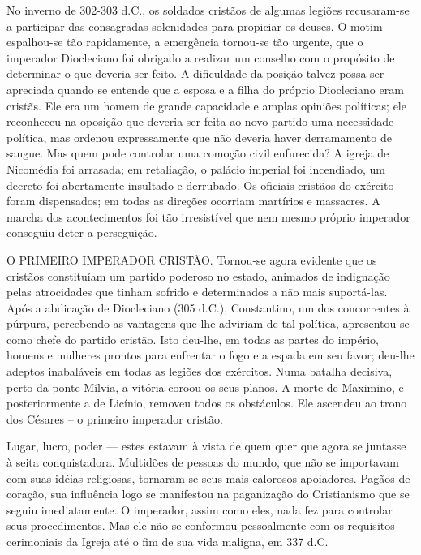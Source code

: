 \documentclass[11pt,a5paper,twoside,openany]{book}
\begin{document}
No inverno de 302-303 d.C., os soldados cristãos de algumas legiões recusaram-se a participar das consagradas solenidades para propiciar os deuses. O motim espalhou-se tão rapidamente, a emergência tornou-se tão urgente, que o imperador Diocleciano foi obrigado a realizar um conselho com o propósito de determinar o que deveria ser feito. A dificuldade da posição talvez possa ser apreciada quando se entende que a esposa e a filha do próprio Diocleciano eram cristãs. Ele era um homem de grande capacidade e amplas opiniões políticas; ele reconheceu na oposição que deveria ser feita ao novo partido uma necessidade política, mas ordenou expressamente que não deveria haver derramamento de sangue. Mas quem pode controlar uma comoção civil enfurecida? A igreja de Nicomédia foi arrasada; em retaliação, o palácio imperial foi incendiado, um decreto foi abertamente insultado e derrubado. Os oficiais cristãos do exército foram dispensados; em todas as direções ocorriam martírios e massacres. A marcha dos acontecimentos foi tão irresistível que nem mesmo próprio imperador conseguiu deter a perseguição.

O PRIMEIRO IMPERADOR CRISTÃO. Tornou-se agora evidente que os cristãos constituíam um partido poderoso no estado, animados de indignação pelas atrocidades que tinham sofrido e determinados a não mais suportá-las. Após a abdicação de Diocleciano (305 d.C.), Constantino, um dos concorrentes à púrpura, percebendo as vantagens que lhe adviriam de tal política, apresentou-se como chefe do partido cristão. Isto deu-lhe, em todas as partes do império, homens e mulheres prontos para enfrentar o fogo e a espada em seu favor; deu-lhe adeptos inabaláveis ​​em todas as legiões dos exércitos. Numa batalha decisiva, perto da ponte Mílvia, a vitória coroou os seus planos. A morte de Maximino, e posteriormente a de Licínio, removeu todos os obstáculos. Ele ascendeu ao trono dos Césares – o primeiro imperador cristão.

Lugar, lucro, poder — estes estavam à vista de quem quer que agora se juntasse à seita conquistadora. Multidões de pessoas do mundo, que não se importavam com suas idéias religiosas, tornaram-se seus mais calorosos apoiadores. Pagãos de coração, sua influência logo se manifestou na paganização do Cristianismo que se seguiu imediatamente. O imperador, assim como eles, nada fez para controlar seus procedimentos. Mas ele não se conformou pessoalmente com os requisitos cerimoniais da Igreja até o fim de sua vida maligna, em 337 d.C.
\end{document}
